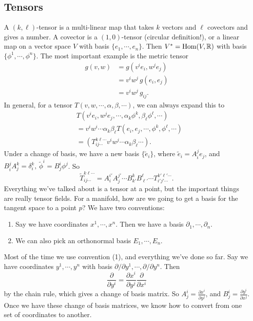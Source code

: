 \subsection{Tensors}
A $(k,\ell)$-tensor is a multi-linear map that takes $k$ vectors and $\ell$ covectors and gives a number. A covector is a $(1,0)$-tensor (circular definition!), or a linear map on a vector space $V$ with basis $\{e_1,\cdots ,e_n \} $. Then $V^*= \operatorname{Hom}(V,\mathbb{R})$ with basis $\{\phi^1,\cdots ,\phi ^n \} $. The most important example is the metric tensor
\begin{align*}
    g(v,w)&=g(v^i e_i ,w^j e_j )\\
          &=v^i w^j \, g(e_i ,e_j )\\
          &=v^i w^j  \, g_{ij}.
\end{align*} In general, for a tensor $T(v,w,\cdots ,\alpha ,\beta ,\cdots )$, we can always expand this to 
\begin{align*}
         &T(v^i e_i, w^j e_j ,\cdots ,\alpha _k \phi^k, \beta _{\ell}\phi^{\ell},\cdots )\\
    &=v^i w^i \cdots \alpha _k\beta _{\ell}T(e_i,e_j ,\cdots ,\phi^k,\phi^{\ell},\cdots )\\
    &= \left( T_{ij\cdots }^{k\ell\cdots }v^i w^j \cdots \alpha _k \beta _{\ell}\cdots  \right) .
\end{align*}
Under a change of basis, we have a new basis $\{\widetilde e_i \} $, where $\widetilde e_i =A_i ^j e_j $, and $B_i ^j A_j^k =\delta_i ^k, \ \widetilde \phi^i =B_j ^i  \phi^j $. So 
\[
\widetilde T_{ij\cdots }^{k\ell \cdots }= A_i ^{i'}A_j ^{j'}\cdots B_{k'}^{k}B_{\ell'}^{\ell}\cdots T_{i'j'\cdots }^{k'\ell '\cdots }.
\] Everything we've talked about is a tensor at a point, but the important things are really tensor fields. For a manifold, how are we going to get a basis for the tangent space to a point $p$? We have two conventions:
\begin{enumerate}[label=(\arabic*)]
    \item Say we have coordinates $x^1,\cdots ,x^n $. Then we have a basis $\partial_1,\cdots ,\partial _n $.
    \item We can also pick an orthonormal basis $E_1,\cdots ,E_n $.
\end{enumerate} Most of the time we use convention (1), and everything we've done so far. Say we have coordinates $y^1,\cdots ,y^n $ with basis $\partial  /\partial y^1,\cdots , \partial  / \partial y^n $. Then \[
\frac{\partial}{\partial y^i }= \frac{\partial x^i }{\partial y^j }\frac{\partial }{\partial x^i }
\] by the chain rule, which gives a change of basis matrix. So $A^i _j = \frac{\partial x^i }{\partial y^j }$, and $B_j ^i =\frac{\partial y^i }{\partial x^j }$. Once we have these change of basis matrices, we know how to convert from one set of coordinates to another.

